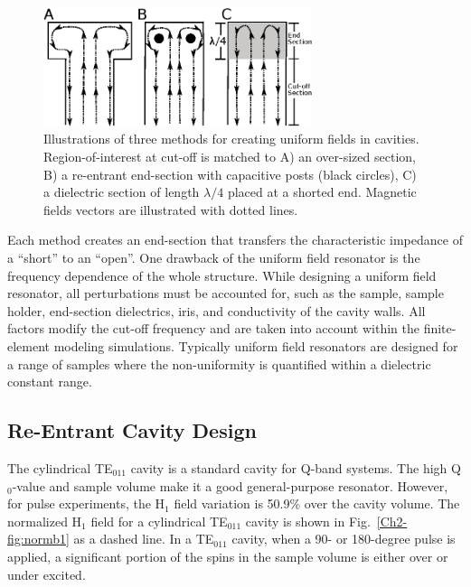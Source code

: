 \begin{figure}[htb]
 \centering
 \includegraphics[width=0.7\textwidth]{Kapitel/Ch2-Images/02-UFIllustration.eps}
 \caption[Methods for creating uniform fields in cavities.]{Illustrations of three methods for creating uniform fields in cavities. Region-of-interest at cut-off is matched to A) an  over-sized section, B) a re-entrant end-section with capacitive posts (black circles), C) a dielectric section of length $\lambda/4$ placed at a shorted end. Magnetic fields vectors are illustrated with dotted lines.}
 \label{fig:UFmethods}
\end{figure}

Each method creates an end-section that transfers the characteristic impedance of a ``short'' to an ``open''. One drawback of the uniform field resonator is the frequency dependence of the whole structure. While designing a uniform field resonator, all perturbations must be accounted for, such as the sample, sample holder, end-section dielectrics, iris, and conductivity of the cavity walls. All factors modify the cut-off frequency and are taken into account within the finite-element modeling simulations. Typically uniform field resonators are designed for a range of samples where the non-uniformity is quantified within a dielectric constant range. 

\subsection{Re-Entrant \cylTE{} Cavity Design}
The cylindrical TE$_{011}$ cavity is a standard cavity for Q-band systems. The high Q$_0$-value and sample volume make it a good general-purpose resonator. However, for pulse experiments, the H$_1$ field variation is 50.9\% over the cavity volume. The normalized H$_1$ field for a cylindrical TE$_{011}$ cavity is shown in Fig.~\ref{Ch2-fig:normb1} as a dashed line. In a TE$_{011}$ cavity, when a 90- or 180-degree pulse is applied, a significant portion of the spins in the sample volume is either over or under excited. 

